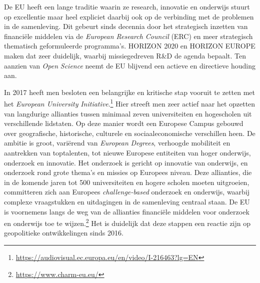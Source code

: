 \documentclass[smallauthor, chapterhaspagenum, nochapterinheader, pagenuminheader,  bigchapnum,medium2, tocpages, garamond, titleinheader]{jote-book}
\begin{document}
	De EU heeft een lange traditie waarin ze research, innovatie en onderwijs stuurt op excellentie maar heel expliciet daarbij ook op de verbinding met de problemen in de samenleving. Dit gebeurt sinds decennia door het strategisch inzetten van financiële middelen via de \emph{European Research Council} (ERC) en meer strategisch thematisch geformuleerde programma's. HORIZON 2020 en HORIZON EUROPE maken dat zeer duidelijk, waarbij missiegedreven R\&D de agenda bepaalt. Ten aanzien van \emph{Open }\emph{Science} neemt de EU blijvend een actieve en directieve houding aan.



	In 2017 heeft men besloten een belangrijke en kritische stap vooruit te zetten met het \emph{European University }\emph{Initiative}.\footnote{\href{https://audiovisual.ec.europa.eu/en/video/I-216463?lg=EN}{https://audiovisual.ec.europa.eu/en/video/I-216463?lg=EN}} Hier streeft men zeer actief naar het opzetten van langdurige allianties tussen minimaal zeven universiteiten en hogescholen uit verschillende lidstaten. Op deze manier wordt een Europese Campus gebouwd over geografische, historische, culturele en sociaaleconomische verschillen heen. De ambitie is groot, variërend van \emph{European }\emph{Degrees}, verhoogde mobiliteit en aantrekken van toptalenten, tot nieuwe Europese entiteiten van hoger onderwijs, onderzoek en innovatie. Het onderzoek is gericht op innovatie van onderwijs, en onderzoek rond grote thema's en missies op Europees niveau. Deze allianties, die in de komende jaren tot 500 universiteiten en hogere scholen moeten uitgroeien, committeren zich aan Europees \emph{challenge-based} onderzoek en onderwijs, waarbij complexe vraagstukken en uitdagingen in de samenleving centraal staan. De EU is voornemens langs de weg van de allianties financiële middelen voor onderzoek en onderwijs toe te wijzen.\footnote{\href{https://www.charm-eu.eu/}{https://www.charm-eu.eu/} } Het is duidelijk dat deze stappen een reactie zijn op geopolitieke ontwikkelingen sinds 2016.
\end{document}
